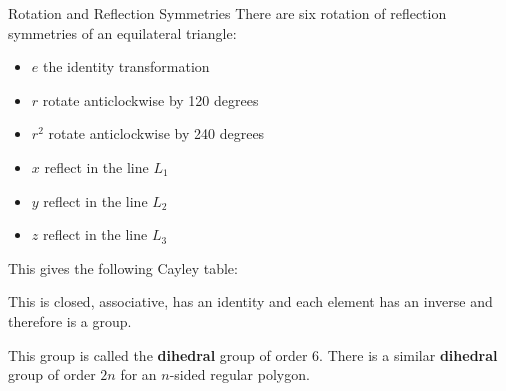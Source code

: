 \documentclass[8pt]{beamer}
\begin{document}
\begin{frame}{Rotation and Reflection Symmetries}
	There are six rotation of reflection symmetries of an equilateral triangle:
	\begin{itemize}
		\item $e$ the identity transformation
		\item  $r$ rotate anticlockwise by 120 degrees
		\item  $r^2$ rotate anticlockwise by 240 degrees
		\item  $x$ reflect in the line  $ L_1$
		\item $y$ reflect in the line  $ L_2$
		\item $z$ reflect in the line  $ L_3$
	\end{itemize}

	This gives the following Cayley table:

	This is closed, associative, has an identity and each element has an inverse and therefore is a group.

	\begin{definition}
		This group is called the \textbf{dihedral} group of order 6. There is a similar \textbf{dihedral} group of order $2n$ for an  $n$-sided regular polygon.  
		
	\end{definition}
	
\end{frame}
\end{document}
